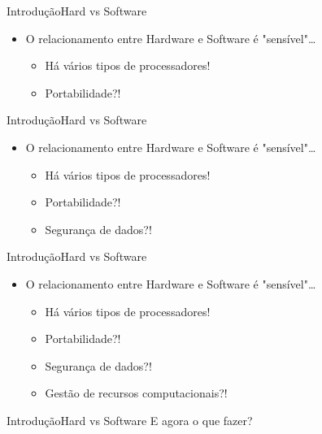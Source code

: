 \documentclass{beamer}
\begin{document}
      \begin{frame}{Introdução}{Hard vs Software}
        \begin{itemize}
          \item O relacionamento entre Hardware e Software é "sensível"\dots
            \begin{itemize}
              \item Há vários tipos de processadores!
              \item Portabilidade?!
            \end{itemize}
        \end{itemize}
      \end{frame}

      \begin{frame}{Introdução}{Hard vs Software}
        \begin{itemize}
          \item O relacionamento entre Hardware e Software é "sensível"\dots
            \begin{itemize}
              \item Há vários tipos de processadores!
              \item Portabilidade?!
              \item Segurança de dados?!
            \end{itemize}
        \end{itemize}
      \end{frame}

      \begin{frame}{Introdução}{Hard vs Software}
        \begin{itemize}
          \item O relacionamento entre Hardware e Software é "sensível"\dots
            \begin{itemize}
              \item Há vários tipos de processadores!
              \item Portabilidade?!
              \item Segurança de dados?!
              \item Gestão de recursos computacionais?!
            \end{itemize}
        \end{itemize}
      \end{frame}

      \begin{frame}{Introdução}{Hard vs Software}
        E agora o que fazer?
      \end{frame}
\end{document}
